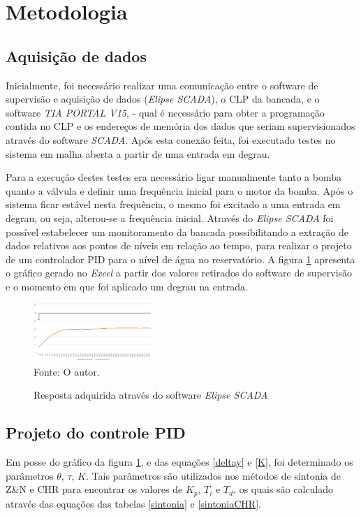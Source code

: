 \documentclass[conference]{IEEEtran}
\begin{document}
\section{Metodologia}

\subsection{Aquisição de dados}

Inicialmente, foi necessário realizar uma comunicação entre o software de supervisão e aquisição de dados (\textit{Elipse SCADA}), o CLP da bancada, e o software \textit{TIA PORTAL V15}, - qual é necessário para obter a programação contida no CLP e os endereços de memória dos dados que seriam supervisionados através do software \textit{SCADA}. Após esta conexão feita, foi executado testes no sistema em malha aberta a partir de uma entrada em degrau.

Para a execução destes testes era necessário ligar manualmente tanto a bomba quanto a válvula e definir uma frequência inicial para o motor da bomba. Após o sistema ficar estável nesta frequência, o mesmo foi excitado a uma entrada em degrau, ou seja, alterou-se a frequência inicial. Através do \textit{Elipse SCADA} foi possível estabelecer um monitoramento da bancada possibilitando a extração de dados relativos aos pontos de níveis em relação ao tempo, para realizar o projeto de um controlador PID para o nível de água no reservatório. A figura \ref{figura:dados} apresenta o gráfico gerado no \textit{Excel} a partir dos valores retirados do software de supervisão e o momento em que foi aplicado um degrau na entrada.

\begin{figure}[!http]
    \centering
    \caption{Resposta adquirida através do software \textit{Elipse SCADA}}
    \includegraphics[width=0.4\textwidth]{imagens/dadosextraido.png}\\
    Fonte: O autor.
    \label{figura:dados}
\end{figure}

\subsection{Projeto do controle PID}
Em posse do gráfico da figura \ref{figura:dados}, e das equações \ref{deltay} e \ref{K}, foi determinado os parâmetros $\theta$, $\tau$, $K$. Tais parâmetros são utilizados nos métodos de sintonia de Z\&N e CHR para encontrar os valores de $K_p$, $T_i$ e $T_d$, os quais são calculado através das equações das tabelas \ref{sintonia} e \ref{sintoniaCHR}.
\end{document}

